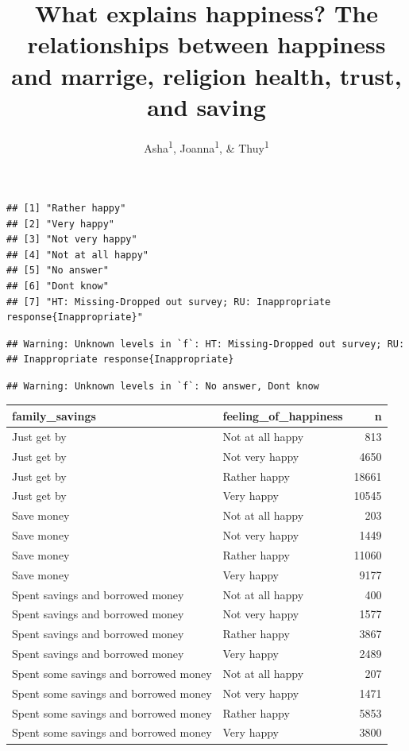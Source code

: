\documentclass[man]{apa6}
\title{What explains happiness? The relationships between happiness and
marrige, religion health, trust, and saving}
\author{Asha\textsuperscript{1}, Joanna\textsuperscript{1}, \&
Thuy\textsuperscript{1}}
\date{}
\affiliation{
\vspace{0.5cm}
\textsuperscript{1} University of Oregon}
\begin{document}
\maketitle

\begin{verbatim}
## [1] "Rather happy"                                                             
## [2] "Very happy"                                                               
## [3] "Not very happy"                                                           
## [4] "Not at all happy"                                                         
## [5] "No answer"                                                                
## [6] "Dont know"                                                                
## [7] "HT: Missing-Dropped out survey; RU: Inappropriate response{Inappropriate}"
\end{verbatim}

\begin{verbatim}
## Warning: Unknown levels in `f`: HT: Missing-Dropped out survey; RU:
## Inappropriate response{Inappropriate}
\end{verbatim}

\begin{verbatim}
## Warning: Unknown levels in `f`: No answer, Dont know
\end{verbatim}

\begin{tabular}{l|l|r}
\hline
family\_savings & feeling\_of\_happiness & n\\
\hline
Just get by & Not at all happy & 813\\
\hline
Just get by & Not very happy & 4650\\
\hline
Just get by & Rather happy & 18661\\
\hline
Just get by & Very happy & 10545\\
\hline
Save money & Not at all happy & 203\\
\hline
Save money & Not very happy & 1449\\
\hline
Save money & Rather happy & 11060\\
\hline
Save money & Very happy & 9177\\
\hline
Spent savings and borrowed money & Not at all happy & 400\\
\hline
Spent savings and borrowed money & Not very happy & 1577\\
\hline
Spent savings and borrowed money & Rather happy & 3867\\
\hline
Spent savings and borrowed money & Very happy & 2489\\
\hline
Spent some savings and borrowed money & Not at all happy & 207\\
\hline
Spent some savings and borrowed money & Not very happy & 1471\\
\hline
Spent some savings and borrowed money & Rather happy & 5853\\
\hline
Spent some savings and borrowed money & Very happy & 3800\\
\hline
\end{tabular}
\end{document}
